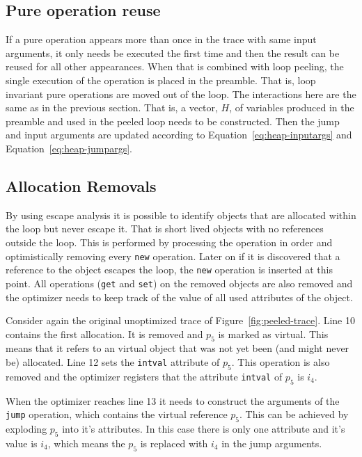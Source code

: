 \documentclass[preprint]{sigplanconf}
\begin{document}
\subsection{Pure operation reuse}
If a pure operation appears more than once in the trace with same input
arguments, it only needs be executed the first time and then the result
can be reused for all other appearances. When that is combined with loop
peeling, the single execution of the operation is placed in the
preamble. That is, loop invariant pure operations are moved out of the
loop. The interactions here are the same as in the previous
section. That is, a vector, $H$, of variables produced in the preamble
and used in the peeled loop needs to be constructed. Then the jump and
input arguments are updated according to
Equation~\ref{eq:heap-inputargs} and Equation~\ref{eq:heap-jumpargs}.

\subsection{Allocation Removals}
By using escape analysis it is possible to identify objects that are
allocated within the loop but never escape it. That is 
short lived objects with no references outside the loop. This
is performed by processing the operation in order and
optimistically removing every \lstinline{new} operation. Later on if
it is discovered that a reference to the object escapes the loop, the
\lstinline{new} operation is inserted at this point. All operations
(\lstinline{get} and \lstinline{set}) on the removed objects are also
removed and the optimizer needs to keep track of the value of all
used attributes of the object.

Consider again the original unoptimized trace of
Figure~\ref{fig:peeled-trace}. Line 10 contains the first
allocation. It is removed and $p_5$ is marked as virtual. This means
that it refers to an virtual object that was not yet been
(and might never be) allocated. Line 12 sets the \lstinline{intval}
attribute of $p_5$. This operation is also removed and the optimizer
registers that the attribute \lstinline{intval} of $p_5$ is $i_4$.

When the optimizer reaches line 13 it needs to construct the
arguments of the \lstinline{jump} operation, which contains the virtual
reference $p_5$. This can be achieved by exploding $p_5$ into it's
attributes. In this case there is only one attribute and it's value is
$i_4$, which means the $p_5$ is replaced with $i_4$ in the jump
arguments. 
\end{document}
